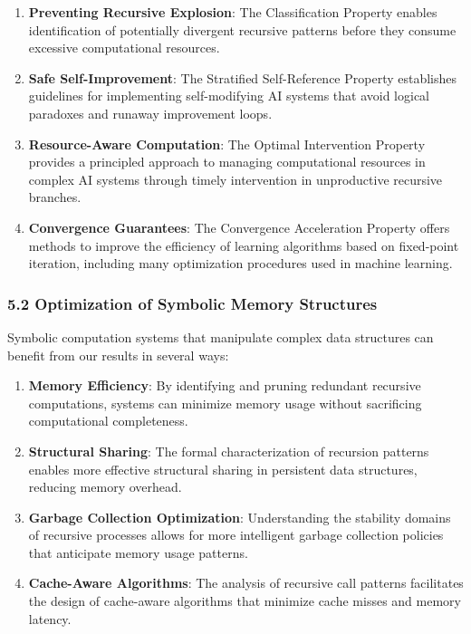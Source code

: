 \documentclass[
]{article}
\begin{document}
\begin{enumerate}
\def\labelenumi{\arabic{enumi}.}
\item
  \textbf{Preventing Recursive Explosion}: The Classification Property
  enables identification of potentially divergent recursive patterns
  before they consume excessive computational resources.
\item
  \textbf{Safe Self-Improvement}: The Stratified Self-Reference Property
  establishes guidelines for implementing self-modifying AI systems that
  avoid logical paradoxes and runaway improvement loops.
\item
  \textbf{Resource-Aware Computation}: The Optimal Intervention Property
  provides a principled approach to managing computational resources in
  complex AI systems through timely intervention in unproductive
  recursive branches.
\item
  \textbf{Convergence Guarantees}: The Convergence Acceleration Property
  offers methods to improve the efficiency of learning algorithms based
  on fixed-point iteration, including many optimization procedures used
  in machine learning.
\end{enumerate}

\subsubsection{5.2 Optimization of Symbolic Memory
Structures}\label{optimization-of-symbolic-memory-structures}

Symbolic computation systems that manipulate complex data structures can
benefit from our results in several ways:

\begin{enumerate}
\def\labelenumi{\arabic{enumi}.}
\item
  \textbf{Memory Efficiency}: By identifying and pruning redundant
  recursive computations, systems can minimize memory usage without
  sacrificing computational completeness.
\item
  \textbf{Structural Sharing}: The formal characterization of recursion
  patterns enables more effective structural sharing in persistent data
  structures, reducing memory overhead.
\item
  \textbf{Garbage Collection Optimization}: Understanding the stability
  domains of recursive processes allows for more intelligent garbage
  collection policies that anticipate memory usage patterns.
\item
  \textbf{Cache-Aware Algorithms}: The analysis of recursive call
  patterns facilitates the design of cache-aware algorithms that
  minimize cache misses and memory latency.
\end{enumerate}
\end{document}
